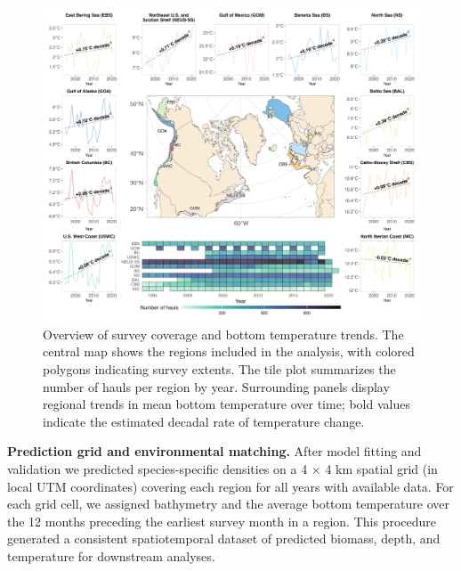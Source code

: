 \documentclass[lineno,pdflatex,sn-nature]{sn-jnl}%
\begin{document}
\begin{figure}[h]
\centering
\includegraphics[width=1\textwidth]{output/figures/main/map.png}
\caption{Overview of survey coverage and bottom temperature trends.
The central map shows the regions included in the analysis, with colored polygons indicating survey extents. The tile plot summarizes the number of hauls per region by year. Surrounding panels display regional trends in mean bottom temperature over time; bold values indicate the estimated decadal rate of temperature change.}\label{fig:map}
\end{figure}

\textbf{Prediction grid and environmental matching.} 
After model fitting and validation we predicted species-specific densities on a 4 × 4 km spatial
grid (in local UTM coordinates) covering each region for all years with available data. For each grid cell, we assigned bathymetry and the average bottom temperature over the 12 months preceding the earliest survey month in a region. This procedure generated a consistent spatiotemporal dataset of predicted biomass, depth, and temperature for downstream analyses.
\end{document}
